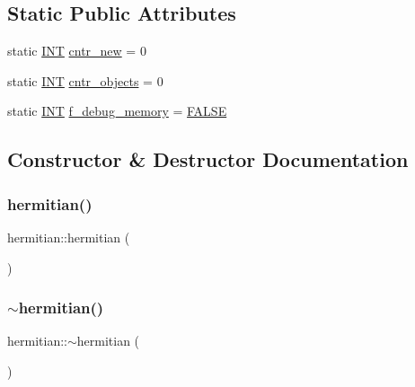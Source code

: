 \subsection*{Static Public Attributes}
\begin{DoxyCompactItemize}
\item 
static \mbox{\hyperlink{galois_8h_a09fddde158a3a20bd2dcadb609de11dc}{I\+NT}} \mbox{\hyperlink{classhermitian_a1d48f171de0cb2b5297ffbab990175f8}{cntr\+\_\+new}} = 0
\item 
static \mbox{\hyperlink{galois_8h_a09fddde158a3a20bd2dcadb609de11dc}{I\+NT}} \mbox{\hyperlink{classhermitian_ad78ff96ab286b030ee6c06a5e7e20180}{cntr\+\_\+objects}} = 0
\item 
static \mbox{\hyperlink{galois_8h_a09fddde158a3a20bd2dcadb609de11dc}{I\+NT}} \mbox{\hyperlink{classhermitian_af996224e36c2fed648477574248c731f}{f\+\_\+debug\+\_\+memory}} = \mbox{\hyperlink{nauty_8h_aa93f0eb578d23995850d61f7d61c55c1}{F\+A\+L\+SE}}
\end{DoxyCompactItemize}


\subsection{Constructor \& Destructor Documentation}
\mbox{\label{classhermitian_a8b6624cdb109f4749b9b029a15e0de7d}} 
\subsubsection{\texorpdfstring{hermitian()}{hermitian()}}
{\footnotesize\ttfamily hermitian\+::hermitian (\begin{DoxyParamCaption}{ }\end{DoxyParamCaption})}

\mbox{\label{classhermitian_a01a42bbede78e21a436b4c7169b24bf7}} 
\subsubsection{\texorpdfstring{$\sim$hermitian()}{~hermitian()}}
{\footnotesize\ttfamily hermitian\+::$\sim$hermitian (\begin{DoxyParamCaption}{ }\end{DoxyParamCaption})}



